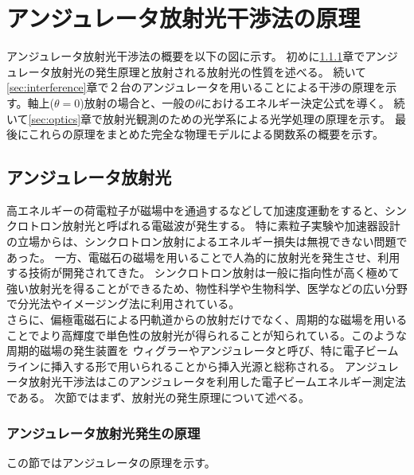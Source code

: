 \documentclass[a4paper,11pt,uplatex]{jsbook}
\begin{document}
\chapter{アンジュレータ放射光干渉法の原理}
アンジュレータ放射光干渉法の概要を以下の図に示す。
初めに\ref{sec:undulator}章でアンジュレータ放射光の発生原理と放射される放射光の性質を述べる。
続いて\ref{sec:interference}章で２台のアンジュレータを用いることによる干渉の原理を示す。軸上($\theta =0$)放射の場合と、一般の$\theta$におけるエネルギー決定公式を導く。
続いて\ref{sec:optics}章で放射光観測のための光学系による光学処理の原理を示す。
最後にこれらの原理をまとめた完全な物理モデルによる関数系の概要を示す。
\section{アンジュレータ放射光}
高エネルギーの荷電粒子が磁場中を通過するなどして加速度運動をすると、シンクロトロン放射光と呼ばれる電磁波が発生する。
特に素粒子実験や加速器設計の立場からは、シンクロトロン放射によるエネルギー損失は無視できない問題であった。
一方、電磁石の磁場を用いることで人為的に放射光を発生させ、利用する技術が開発されてきた。
シンクロトロン放射は一般に指向性が高く極めて強い放射光を得ることができるため、物性科学や生物科学、医学などの広い分野で分光法やイメージング法に利用されている。\\
さらに、偏極電磁石による円軌道からの放射だけでなく、周期的な磁場を用いることでより高輝度で単色性の放射光が得られることが知られている。このような周期的磁場の発生装置を
ウィグラーやアンジュレータと呼び、特に電子ビームラインに挿入する形で用いられることから挿入光源と総称される。
アンジュレータ放射光干渉法はこのアンジュレータを利用した電子ビームエネルギー測定法である。
次節ではまず、放射光の発生原理について述べる。

\subsection{アンジュレータ放射光発生の原理}\label{sec:undulator}
この節ではアンジュレータの原理を示す。
\end{document}
